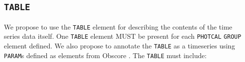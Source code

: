 \documentclass[11pt,a4paper]{ivoa}
\let\fg=\color
\def\elem#1{{\tt{\fg{DarkRed}#1}}}
\begin{document}
\subsection{\elem{TABLE}}
We propose to use the \elem{TABLE} element for describing the contents of the time series data itself. One \elem{TABLE} element MUST be present for each \elem{PHOTCAL} \elem{GROUP} element defined. We also propose to annotate the \elem{TABLE} as a timeseries using \elem{PARAM}s defined as elements from Obscore \citep{std:OBSCORE1.1}.   
The \elem{TABLE} must include: 
\end{document}
